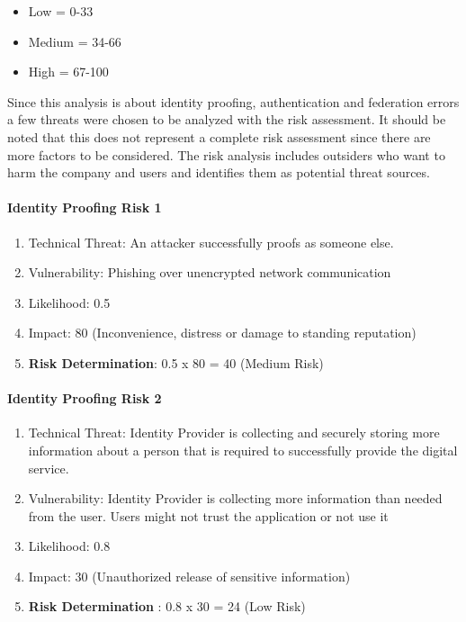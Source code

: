 \begin{itemize}
	\item Low =     0-33
	\item Medium = 34-66
	\item High =   67-100
\end{itemize}

Since this analysis is about identity proofing, authentication and federation errors a few threats were chosen to be analyzed with the risk assessment. It should be noted that this does not represent a complete risk assessment since there are more factors to be considered. The risk analysis includes outsiders who want to harm the company and users and identifies them as potential threat sources. 

\paragraph{Identity Proofing Risk 1}

\begin{enumerate}
	\item Technical Threat: An attacker successfully proofs as someone else.
	\item Vulnerability: Phishing over unencrypted network communication
	\item Likelihood: 0.5
	\item Impact: 80 (Inconvenience, distress or damage to standing reputation)
	\item \textbf{Risk Determination}: 0.5 x 80 = 40 (Medium Risk) 
\end{enumerate}
\pagebreak[4]

\paragraph{Identity Proofing Risk 2}
\begin{enumerate}
	\item Technical Threat: Identity Provider is collecting and securely storing more information about a person that is required to successfully provide the digital service.
	\item Vulnerability: Identity Provider is collecting more information than needed from the user. Users might not trust the application or not use it
	\item Likelihood: 0.8
	\item Impact: 30  (Unauthorized release of sensitive information)
	\item \textbf{Risk Determination} : 0.8 x 30 = 24 (Low Risk)
\end{enumerate}


